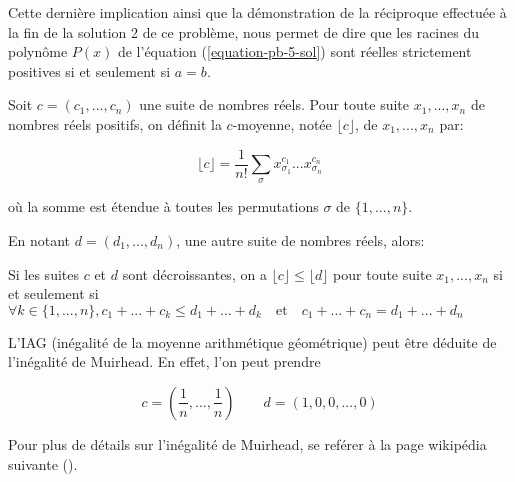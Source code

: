 \documentclass[12pt,a4paper,article]{memoir}
\newcommand{\floor}[1]{\lfloor #1 \rfloor}
\begin{document}
\bigskip

Cette dernière implication ainsi que la démonstration de la réciproque effectuée à la fin de la solution 2 de ce problème, nous permet de dire que les racines du polynôme $P(x)$ de l'équation (\ref{equation-pb-5-sol}) sont réelles strictement positives si et seulement si  $a=b$.

\bigskip

\begin{myremark}[colback=red!5!white,colframe=blue!75!black,mytitle={Inégalité de Muirhead et des moyennes arithmétique géométrique}, label=exfour]
Soit $c = (c_{1}, ..., c_{n})$ une suite de nombres réels. Pour toute suite $x_{1}, ..., x_{n}$ de nombres réels positifs, on définit la $c$-moyenne, notée $\floor{c}$, de $x_{1}, ..., x_{n}$ par:

\[\floor{c} = \frac{1}{n!}\sum_{\sigma} x_{\sigma_{1}}^{c_{1}} ... x_{\sigma_{n}}^{c_{n}}\]

où la somme est étendue à toutes les permutations $\sigma$ de $\{1, ..., n\}$.

\bigskip

En notant $d = (d_{1}, ..., d_{n})$, une autre suite de nombres réels, alors:

\bigskip

Si les suites $c$ et $d$ sont décroissantes, on a $\floor{c} \leq \floor{d}$ pour toute suite $x_{1}, ..., x_{n}$ si et seulement si $\forall k \in \{1, ..., n\},  c_{1} + ... + c_{k} \leq d_{1} + ... + d_{k} \quad \textrm{et} \quad c_{1} + ... + c_{n} = d_{1} + ... + d_{n}$

\bigskip

L'IAG (inégalité de la moyenne arithmétique géométrique) peut être déduite de l'inégalité de Muirhead. En effet, l'on peut prendre 

\[c = \left(\frac{1}{n}, ...,\frac{1}{n}\right)\quad \textrm{} \quad d = (1, 0, 0, ...,0)\]

Pour plus de détails sur l'inégalité de Muirhead, se reférer à la page wikipédia suivante (\cite{wikimuirh}).
\end{myremark}
\end{document}
